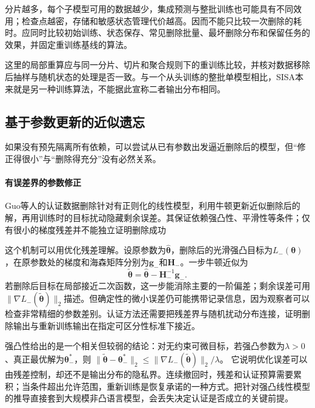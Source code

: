 分片越多，每个子模型可用的数据越少，集成预测与整批训练也可能具有不同效用；检查点越密，存储和敏感状态管理代价越高。因而不能只比较一次删除的耗时。应同时比较初始训练、状态保存、常见删除批量、最坏删除分布和保留任务的效果，并固定重训练基线的算法。

这里的局部重算应与同一分片、切片和聚合规则下的重训练比较，并核对数据移除后抽样与随机状态的处理是否一致。与一个从头训练的整批单模型相比，SISA本来就是另一种训练算法，不能据此宣称二者输出分布相同。

\subsection{基于参数更新的近似遗忘}
\label{sec:privacy-unlearning-correction}

如果没有预先隔离所有依赖，可以尝试从已有参数出发逼近删除后的模型，但“修正得很小”与“删除得充分”没有必然关系。

\paragraph{有误差界的参数修正}

Guo等人的认证数据删除针对有正则化的线性模型，利用牛顿更新近似删除后的解，再用训练时的目标扰动隐藏剩余误差。其保证依赖强凸性、平滑性等条件；仅有很小的梯度残差并不能独立证明删除成功

这个机制可以用优化残差理解。设原参数为$\hat{\bm\theta}$，删除后的光滑强凸目标为$L_-(\bm\theta)$，在原参数处的梯度和海森矩阵分别为$\bm g_-$和$\bm H_-$。一步牛顿近似为
\begin{equation}
 \tilde{\bm\theta}
 =\hat{\bm\theta}-\bm H_-^{-1}\bm g_-.
 \label{eq:privacy-newton-removal}
\end{equation}
若删除后目标在局部接近二次函数，这一步能消除主要的一阶偏差；剩余误差可用$\|\nabla L_-(\tilde{\bm\theta})\|_2$描述。但确定性的微小误差仍可能携带记录信息，因为观察者可以检查非常精细的参数差别。认证方法还需要把残差界与随机扰动分布连接，证明删除输出与重新训练输出在指定可区分性标准下接近。

强凸性给出的是一个相关但较弱的结论：对无约束可微目标，若强凸参数为$\lambda>0$、真正最优解为$\bm\theta_-^*$，则
$\|\tilde{\bm\theta}-\bm\theta_-^*\|_2
\leq\|\nabla L_-(\tilde{\bm\theta})\|_2/\lambda$。
它说明优化误差可以由残差控制，却还不是输出分布的隐私界。连续撤回时，残差和认证预算需要累积；当条件超出允许范围，重新训练是恢复承诺的一种方式。把针对强凸线性模型的推导直接套到大规模非凸语言模型，会丢失决定认证是否成立的关键前提。

